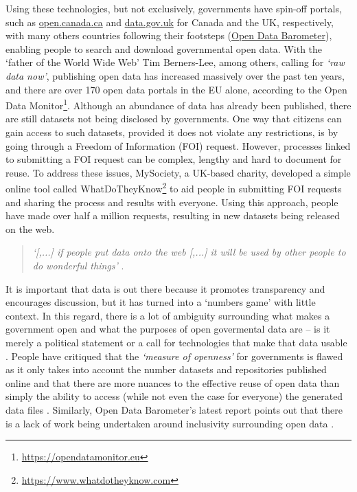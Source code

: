 Using these technologies, but not exclusively, governments have spin-off portals, such as \href{https://open.canada.ca}{open.canada.ca} and \href{https://data.gov.uk/}{data.gov.uk} for Canada and the UK, respectively, with many others countries following their footsteps (\href{https://opendatabarometer.org}{Open Data Barometer}), enabling people to search and download governmental open data. With the `father of the World Wide Web' Tim Berners-Lee, among others, calling for \textit{`raw data now'}, publishing open data has increased massively over the past ten years, and there are over 170 open data portals in the EU alone, according to the Open Data Monitor\footnote{\url{https://opendatamonitor.eu}}. Although an abundance of data has already been published, there are still datasets not being disclosed by governments. One way that citizens can 
gain access to such datasets, provided it does not violate any restrictions, is by going through a Freedom of Information (FOI) request. However, processes linked to submitting a FOI request can be complex, lengthy and hard to document for reuse. To address these issues, MySociety, a UK-based charity, developed a simple online tool called WhatDoTheyKnow\footnote{\url{https://www.whatdotheyknow.com}} to aid people in submitting FOI requests and sharing the process and results with everyone. Using this approach, people have made over half a million requests, resulting in new datasets being released on the web.
\begin{quote}
    \textit{`[,...] if people put data onto the web [,...] it will be used by other people to do wonderful things'} \citep{berners-lee_year_2010}.
\end{quote}
It is important that data is out there because it promotes transparency and encourages discussion, but it has turned into a `numbers game' with little context. In this regard, there is a lot of ambiguity surrounding what makes a government open and what the purposes of open govermental data are -- is it merely a political statement or a call for technologies that make that data usable \citep{renee_e._sieber_civic_2015}. People have critiqued that the \textit{`measure of openness'} for governments is flawed as it only takes into account the number datasets and repositories published online \citep{davies_open_2010} and that there are more nuances to the effective reuse of open data than simply the ability to access (while not even the case for everyone) the generated data files \citep{gurstein_effective_2003,gurstein_open_2011}. Similarly, Open Data Barometer's latest report points out that there is a lack of work being undertaken around inclusivity surrounding open data \citep{world_wide_web_foundation_open_2018}. 

